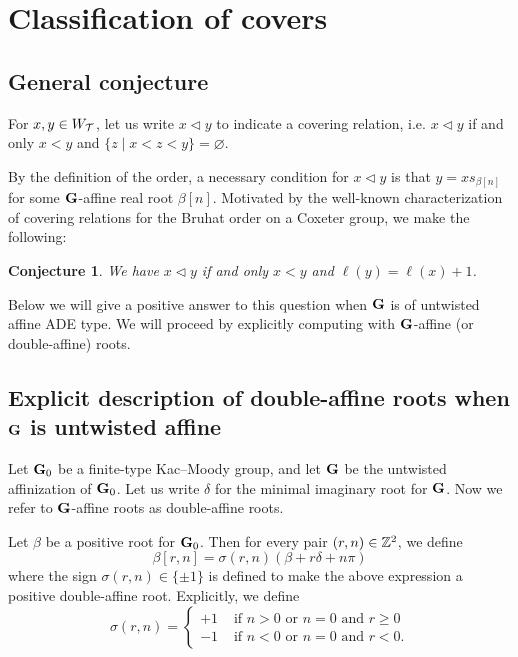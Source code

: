 \documentclass[10pt]{amsart}
\newtheorem{conj}[theo]{Conjecture}
\newcommand{\textif}{\text{ if }}\newcommand{\textand}{\text{ and }}\newcommand{\textor}{\text{ or }}\newcommand{\suchthat}{\mid}
\begin{document}
\section{Classification of covers}

\subsection{General conjecture}

For $x,y \in W_{\mathcal{T}}$, let us write $x\lhd y$ to indicate a covering relation, i.e. $x\lhd y$ if and only $x<y$ and $\{z \suchthat x<z<y\}=\varnothing$.

By the definition of the order, a necessary condition for $ x \lhd y$ is that $y = x s_{\beta[n]}$ for some $\mathbf{G}$-affine real root $\beta[n]$. Motivated by the well-known characterization of covering relations for the Bruhat order on a Coxeter group, we make the following:

\begin{conj}\label{conj:covers}
We have $x\lhd y$ if and only $ x < y$ and $\ell(y)=\ell(x)+1$.
\end{conj}

Below we will give a positive answer to this question when $\mathbf{G}$ is of untwisted affine ADE type. We will proceed by explicitly computing with $\mathbf{G}$-affine (or double-affine) roots.

\subsection{Explicit description of double-affine roots when \texorpdfstring{$\mathbf{G}$}{G} is untwisted affine}

Let $\mathbf{G}_0$ be a finite-type Kac--Moody group, and let $\mathbf{G}$ be the untwisted affinization of $\mathbf{G}_0$. Let us write $\delta$ for the minimal imaginary root for $\mathbf{G}$. Now we refer to $\mathbf{G}$-affine roots as double-affine roots.

Let $\beta$ be a positive root for $\mathbf{G}_0$. Then for every pair $(r,n) \in \mathbb{Z}^2$, we define
\begin{equation}
\beta[r,n] = \sigma(r,n)(\beta + r\delta + n \pi)
\end{equation}
where the sign $\sigma(r,n) \in \{\pm1\}$ is defined to make the above expression a positive double-affine root. Explicitly, we define
\begin{equation}
\sigma(r,n) =
\begin{cases}
+1 & \textif n > 0 \textor n=0 \textand r\geq0 \\
-1 & \textif n < 0 \textor n=0 \textand r<0.
\end{cases}
\end{equation}
\end{document}

